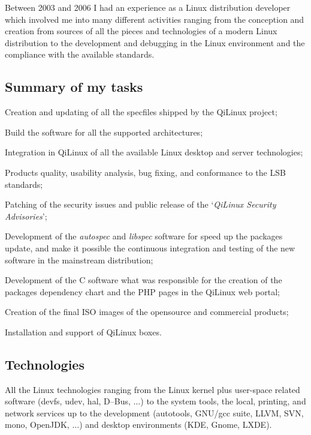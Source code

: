 Between 2003 and 2006 I had an experience as a Linux distribution developer 
which involved me into many different activities ranging from the conception
and creation from sources of all the pieces and technologies of a modern Linux
distribution to the development and debugging in the Linux environment and 
the compliance with the available standards.

\subsection{Summary of my tasks}

\item{\bdot} Creation and updating of all the specfiles shipped by the QiLinux project;
\item{\bdot} Build the software for all the supported architectures;
\item{\bdot} Integration in QiLinux of all the available Linux desktop and server technologies;
\item{\bdot} Products quality, usability analysis, bug fixing, and conformance to
    the LSB standards;
\item{\bdot} Patching of the security issues and public release of the 
   `{\it QiLinux Security Advisories\/}';
\item{\bdot} Development of the {\it autospec} and {\it libspec} software for speed up the
    packages update, and make it possible the continuous
    integration and testing of the new software in the mainstream distribution;
\item{\bdot} Development of the C software what was responsible for the creation
   of the packages dependency chart and the PHP pages in the QiLinux web portal;
\item{\bdot} Creation of the final ISO images of the opensource and commercial products;
\item{\bdot} Installation and support of QiLinux boxes.

\subsection{Technologies}

\vskip 0pt\noindent
All the Linux technologies ranging from the Linux kernel plus user-space 
related software (devfs, udev, hal, D--Bus, $\dots$) to the system tools, the local,
printing, and network services up to the development (autotools, GNU/gcc suite, 
LLVM, SVN, mono, OpenJDK, $\dots$) and desktop environments (KDE, Gnome, LXDE).

